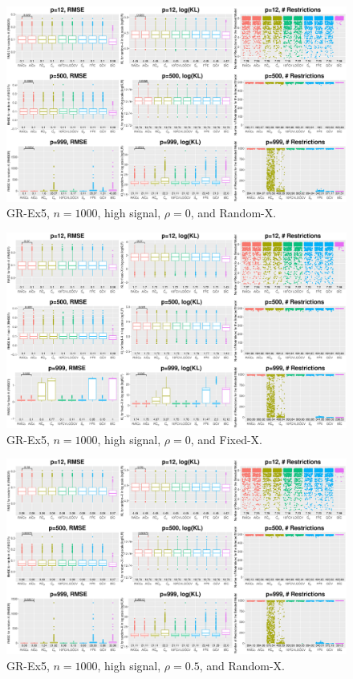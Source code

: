 \clearpage
\begin{figure}[!ht]
\centering
\includegraphics[width=\textwidth]{figures/supplement/randomx_GR-Ex5_n1000_hsnr_rho0.eps}
\caption{GR-Ex5, $n=1000$, high signal, $\rho=0$, and Random-X.}
\end{figure}
\begin{figure}[!ht]
\centering
\includegraphics[width=\textwidth]{figures/supplement/fixedx_GR-Ex5_n1000_hsnr_rho0.eps}
\caption{GR-Ex5, $n=1000$, high signal, $\rho=0$, and Fixed-X.}
\end{figure}
\clearpage
\begin{figure}[!ht]
\centering
\includegraphics[width=\textwidth]{figures/supplement/randomx_GR-Ex5_n1000_hsnr_rho05.eps}
\caption{GR-Ex5, $n=1000$, high signal, $\rho=0.5$, and Random-X.}
\end{figure}
